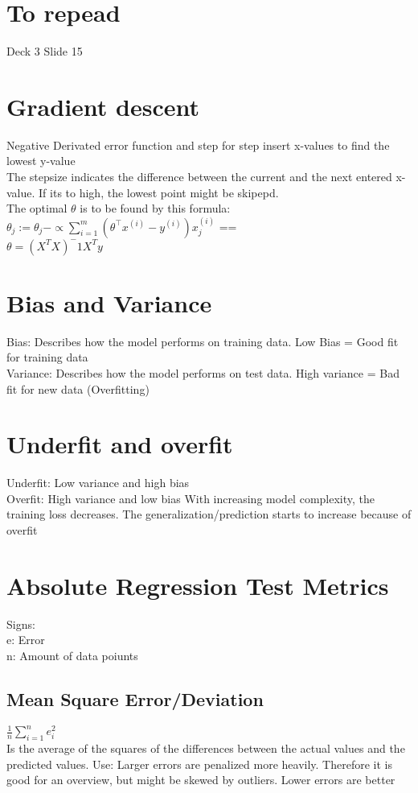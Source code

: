 \documentclass{article}
\begin{document}
\section{To repead}
Deck 3 Slide 15

\section{Gradient descent}
Negative Derivated error function and step for step insert x-values to find the lowest y-value \\
The stepsize indicates the difference between the current and the next entered x-value. If its to high, the lowest point might be skipepd. \\
The optimal $\theta$ is to be found by this formula: \\
$\theta_j := \theta_j - \propto \sum_{i=1}^{m} \left( \theta^\top x^{(i)} - y^{(i)} \right) x_j^{(i)}$ ==\\
$\theta = (X^TX)^-1X^Ty$ 

\section{Bias and Variance}
Bias: Describes how the model performs on training data. Low Bias = Good fit for training data\\
Variance: Describes how the model performs on test data. High variance = Bad fit for new data (Overfitting) \\

\section{Underfit and overfit}
Underfit: Low variance and high bias \\
Overfit: High variance and low bias
With increasing model complexity, the training loss decreases. The generalization/prediction starts to increase because of overfit
\section{Absolute Regression Test Metrics}
Signs: \\
e: Error \\
n: Amount of data poiunts\\

\subsection{Mean Square Error/Deviation}
$\frac{1}{n} \sum_{i = 1}^{n} e_i^2 $ \\
Is the average of the squares of the differences between the actual values and the predicted values.
Use: Larger errors are penalized more heavily. Therefore it is good for an overview, but might be skewed by outliers. Lower errors are better
\end{document}
